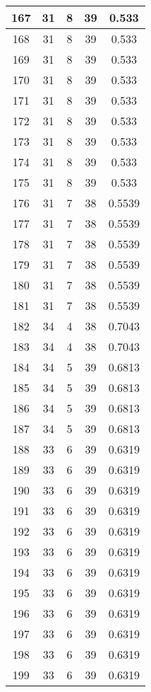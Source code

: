 \documentclass[letterpaper, 12pt]{article}
\begin{document}
\begin{longtable}{|c|c|c|c|c|}
\hline
167 & 31 & 8 & 39 & 0.533 \\
\hline
168 & 31 & 8 & 39 & 0.533 \\
\hline
169 & 31 & 8 & 39 & 0.533 \\
\hline
170 & 31 & 8 & 39 & 0.533 \\
\hline
171 & 31 & 8 & 39 & 0.533 \\
\hline
172 & 31 & 8 & 39 & 0.533 \\
\hline
173 & 31 & 8 & 39 & 0.533 \\
\hline
174 & 31 & 8 & 39 & 0.533 \\
\hline
175 & 31 & 8 & 39 & 0.533 \\
\hline
176 & 31 & 7 & 38 & 0.5539 \\
\hline
177 & 31 & 7 & 38 & 0.5539 \\
\hline
178 & 31 & 7 & 38 & 0.5539 \\
\hline
179 & 31 & 7 & 38 & 0.5539 \\
\hline
180 & 31 & 7 & 38 & 0.5539 \\
\hline
181 & 31 & 7 & 38 & 0.5539 \\
\hline
182 & 34 & 4 & 38 & 0.7043 \\
\hline
183 & 34 & 4 & 38 & 0.7043 \\
\hline
184 & 34 & 5 & 39 & 0.6813 \\
\hline
185 & 34 & 5 & 39 & 0.6813 \\
\hline
186 & 34 & 5 & 39 & 0.6813 \\
\hline
187 & 34 & 5 & 39 & 0.6813 \\
\hline
188 & 33 & 6 & 39 & 0.6319 \\
\hline
189 & 33 & 6 & 39 & 0.6319 \\
\hline
190 & 33 & 6 & 39 & 0.6319 \\
\hline
191 & 33 & 6 & 39 & 0.6319 \\
\hline
192 & 33 & 6 & 39 & 0.6319 \\
\hline
193 & 33 & 6 & 39 & 0.6319 \\
\hline
194 & 33 & 6 & 39 & 0.6319 \\
\hline
195 & 33 & 6 & 39 & 0.6319 \\
\hline
196 & 33 & 6 & 39 & 0.6319 \\
\hline
197 & 33 & 6 & 39 & 0.6319 \\
\hline
198 & 33 & 6 & 39 & 0.6319 \\
\hline
199 & 33 & 6 & 39 & 0.6319 \\
\hline
\end{longtable}
\end{document}

